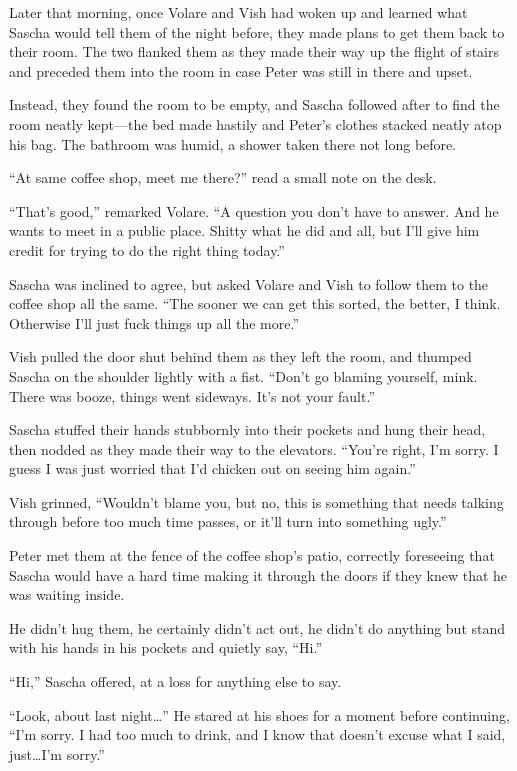 \secdiv{}

Later that morning, once Volare and Vish had woken up and learned what Sascha would tell them of the night before, they made plans to get them back to their room. The two flanked them as they made their way up the flight of stairs and preceded them into the room in case Peter was still in there and upset.

Instead, they found the room to be empty, and Sascha followed after to find the room neatly kept---the bed made hastily and Peter's clothes stacked neatly atop his bag. The bathroom was humid, a shower taken there not long before.

``At same coffee shop, meet me there?'' read a small note on the desk.

``That's good,'' remarked Volare. ``A question you don't have to answer. And he wants to meet in a public place. Shitty what he did and all, but I'll give him credit for trying to do the right thing today.''

Sascha was inclined to agree, but asked Volare and Vish to follow them to the coffee shop all the same. ``The sooner we can get this sorted, the better, I think. Otherwise I'll just fuck things up all the more.''

Vish pulled the door shut behind them as they left the room, and thumped Sascha on the shoulder lightly with a fist. ``Don't go blaming yourself, mink. There was booze, things went sideways. It's not your fault.''

Sascha stuffed their hands stubbornly into their pockets and hung their head, then nodded as they made their way to the elevators. ``You're right, I'm sorry. I guess I was just worried that I'd chicken out on seeing him again.''

Vish grinned, ``Wouldn't blame you, but no, this is something that needs talking through before too much time passes, or it'll turn into something ugly.''

\secdiv{}

Peter met them at the fence of the coffee shop's patio, correctly foreseeing that Sascha would have a hard time making it through the doors if they knew that he was waiting inside.

He didn't hug them, he certainly didn't act out, he didn't do anything but stand with his hands in his pockets and quietly say, ``Hi.''

``Hi,'' Sascha offered, at a loss for anything else to say.

``Look, about last night\ldots{}'' He stared at his shoes for a moment before continuing, ``I'm sorry. I had too much to drink, and I know that doesn't excuse what I said, just\ldots{}I'm sorry.''

